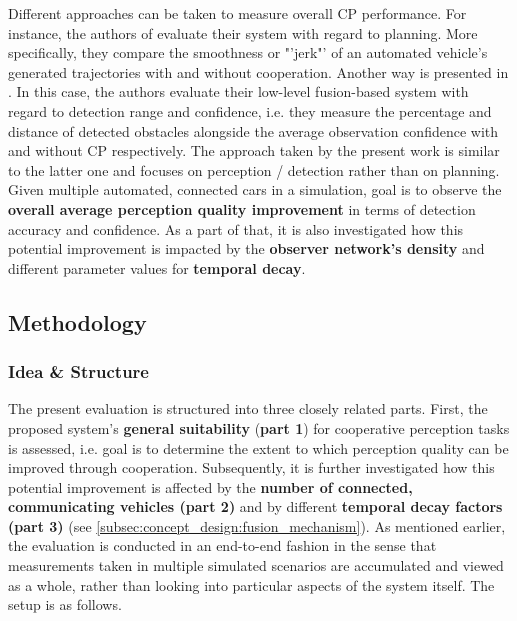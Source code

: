 Different approaches can be taken to measure overall CP performance. For instance, the authors of \cite{liu2013motion} evaluate their system with regard to planning. More specifically, they compare the smoothness or "'jerk"' of an automated vehicle's generated trajectories with and without cooperation. Another way is presented in \cite{Chen2019}. In this case, the authors evaluate their low-level fusion-based system with regard to detection range and confidence, i.e. they measure the percentage and distance of detected obstacles alongside the average observation confidence with and without CP respectively. The approach taken by the present work is similar to the latter one and focuses on perception / detection rather than on planning. Given multiple automated, connected cars in a simulation, goal is to observe the \textbf{overall average perception quality improvement} in terms of detection accuracy and confidence. As a part of that, it is also investigated how this potential improvement is impacted by the \textbf{observer network's density} and different parameter values for \textbf{temporal decay}.

\subsection{Methodology}
\label{subsec:evaluation:perception_evaluation:methodology}

\subsubsection{Idea \& Structure}
The present evaluation is structured into three closely related parts. First, the proposed system's \textbf{general suitability} (\textbf{part 1}) for cooperative perception tasks is assessed, i.e. goal is to determine the extent to which perception quality can be improved through cooperation. Subsequently, it is further investigated how this potential improvement is affected by the \textbf{number of connected, communicating vehicles (part 2)} and by different \textbf{temporal decay factors (part 3)} (see \cref{subsec:concept_design:fusion_mechanism}). As mentioned earlier, the evaluation is conducted in an end-to-end fashion in the sense that measurements taken in multiple simulated scenarios are accumulated and viewed as a whole, rather than looking into particular aspects of the system itself. The setup is as follows.
\par
\bigskip

